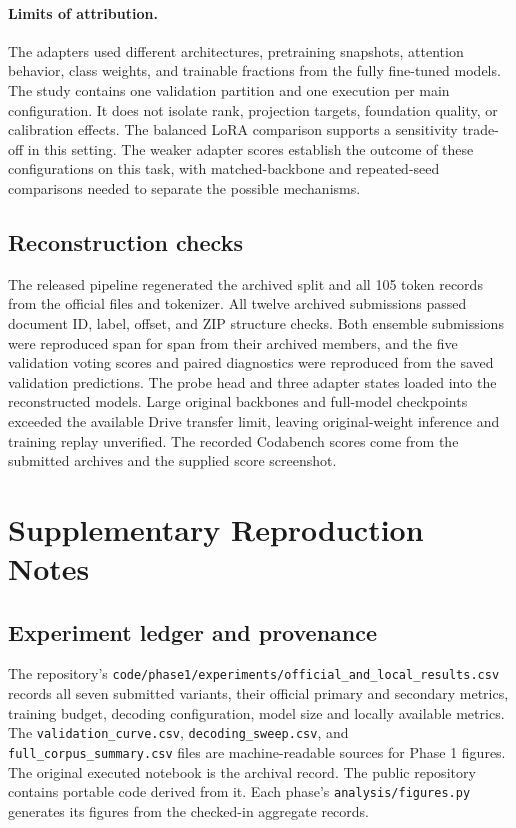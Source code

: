 \documentclass[11pt,a4paper]{article}
\newcommand{\method}[1]{\texttt{#1}}
\begin{document}
\paragraph{Limits of attribution.}
The adapters used different architectures, pretraining snapshots, attention behavior, class weights, and trainable fractions from the fully fine-tuned models. The study contains one validation partition and one execution per main configuration. It does not isolate rank, projection targets, foundation quality, or calibration effects. The balanced LoRA comparison supports a sensitivity trade-off in this setting. The weaker adapter scores establish the outcome of these configurations on this task, with matched-backbone and repeated-seed comparisons needed to separate the possible mechanisms.

\subsection{Reconstruction checks}
The released pipeline regenerated the archived split and all 105 token records from the official files and tokenizer. All twelve archived submissions passed document ID, label, offset, and ZIP structure checks. Both ensemble submissions were reproduced span for span from their archived members, and the five validation voting scores and paired diagnostics were reproduced from the saved validation predictions. The probe head and three adapter states loaded into the reconstructed models. Large original backbones and full-model checkpoints exceeded the available Drive transfer limit, leaving original-weight inference and training replay unverified. The recorded Codabench scores come from the submitted archives and the supplied score screenshot.









\appendix
\section{Supplementary Reproduction Notes}
\subsection{Experiment ledger and provenance}
The repository's \method{code/phase1/experiments/official\_and\_local\_results.csv} records all seven submitted variants, their official primary and secondary metrics, training budget, decoding configuration, model size and locally available metrics. The \method{validation\_curve.csv}, \method{decoding\_sweep.csv}, and \method{full\_corpus\_summary.csv} files are machine-readable sources for Phase 1 figures. The original executed notebook is the archival record. The public repository contains portable code derived from it. Each phase's \method{analysis/figures.py} generates its figures from the checked-in aggregate records.
\end{document}
